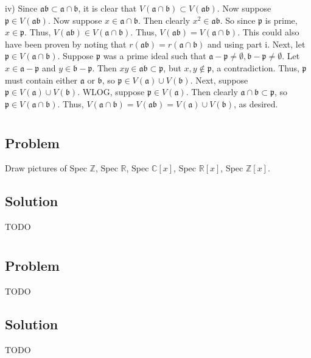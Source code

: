 \documentclass[book,12pt,oneside,openany]{memoir}
\begin{document}
iv) Since $\mathfrak{ab} \subset \mathfrak{a} \cap \mathfrak{b}$, it is clear that $V(\mathfrak{a} \cap \mathfrak{b}) \subset V(\mathfrak{ab})$. Now suppose $\mathfrak{p} \in V(\mathfrak{ab})$. Now suppose $x \in \mathfrak{a} \cap \mathfrak{b}$. Then clearly $x^2 \in \mathfrak{a}\mathfrak{b}$. So since $\mathfrak{p}$ is prime, $x \in \mathfrak{p}$. Thus, $V(\mathfrak{ab}) \in V(\mathfrak{a} \cap \mathfrak{b})$. Thus, $V(\mathfrak{ab}) = V(\mathfrak{a} \cap \mathfrak{b})$. This could also have been proven by noting that $r(\mathfrak{ab})  = r(\mathfrak{a} \cap \mathfrak{b})$ and using part i. Next, let $\mathfrak{p} \in V(\mathfrak{a} \cap \mathfrak{b})$. Suppose $\mathfrak{p}$ was a prime ideal such that $\mathfrak{a} - \mathfrak{p} \neq \emptyset, \mathfrak{b} - \mathfrak{p} \neq \emptyset$. Let $x \in \mathfrak{a} - \mathfrak{p}$ and $y \in \mathfrak{b} - \mathfrak{p}$. Then $xy \in \mathfrak{ab} \subset \mathfrak{p}$, but $x,y \notin \mathfrak{p}$, a contradiction. Thus, $\mathfrak{p}$ must contain either $\mathfrak{a}$ or $\mathfrak{b}$, so $\mathfrak{p} \in V(\mathfrak{a}) \cup V(\mathfrak{b})$. Next, suppose $\mathfrak{p} \in V(\mathfrak{a}) \cup V(\mathfrak{b})$. WLOG, suppose $\mathfrak{p} \in V(\mathfrak{a})$. Then clearly $\mathfrak{a} \cap \mathfrak{b} \subset \mathfrak{p}$, so $\mathfrak{p} \in V(\mathfrak{a} \cap \mathfrak{b})$. Thus, $V(\mathfrak{a} \cap \mathfrak{b}) = V(\mathfrak{a}\mathfrak{b}) = V(\mathfrak{a}) \cup V(\mathfrak{b})$, as desired.


\section{}
\subsection{Problem}
Draw pictures of Spec $\mathbb{Z}$, Spec $\mathbb{R}$, Spec $\mathbb{C}[x]$, Spec $\mathbb{R}[x]$, Spec $\mathbb{Z}[x]$.
\subsection{Solution}
TODO


\section{}
\subsection{Problem}
TODO
\subsection{Solution}
TODO
\end{document}

